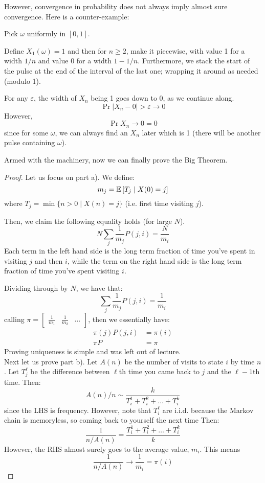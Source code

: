 However, convergence in probability does not always imply almost sure convergence. Here is a counter-example:

\begin{example} 
    Pick $\omega$ uniformly in $[0, 1]$.

    Define $X_1(\omega) = 1$ and then for $n \geq 2$, make it piecewise, with value 1 for a width $1/n$ and value
    0 for a width $1 - 1/n$. Furthermore, we stack the start of the pulse at the end of the interval of the last one; wrapping it around as
    needed (modulo 1).

    For any $\varepsilon$, the width of $X_n$ being 1 goes down to 0, as we continue along.
    \[ \Pr{|X_n - 0| > \varepsilon} \to 0 \]
    However,
    \[\Pr{X_n \to 0} = 0\]
    since for some $\omega$, we can always find an $X_n$ later which is 1 (there will be another pulse containing $\omega$).
\end{example}

Armed with the machinery, now we can finally prove the Big Theorem.

\begin{proof}
    Let us focus on part a).
    We define:
    \[ m_j = \mathbb{E}\left[ T_j \mid X(0) = j \right] \]
    where $T_j = \min\{n > 0 \mid X(n) = j\}$ (i.e. first time visiting $j$).

    Then, we claim the following equality holds (for large $N$).
    \[ N \sum_j \frac{1}{m_j} P(j, i) = \frac{N}{m_i} \]
    Each term in the left hand side is the long term fraction of time you've spent in visiting $j$ and then $i$,
    while the term on the right hand side is the long term fraction of time you've spent visiting $i$.

    Dividing through by $N$, we have that:
    \[ \sum_j \frac{1}{m_j} P(j, i) = \frac{1}{m_i} \]
    calling $\pi = \begin{bmatrix}
        \frac{1}{m_1} & \frac{1}{m_2} & \dots
    \end{bmatrix}$, then we essentially have:
    \begin{align*}
        \pi(j) P(j, i) &= \pi(i) \\
        \pi P &= \pi
    \end{align*}
    Proving uniqueness is simple and was left out of lecture.
\\

    Next let us prove part b).
    Let $A(n)$ be the number of visits to state $i$ by time $n$.
    Let $T_j^{\ell}$ be the difference between $\ell$th time you came back to $j$ and the $\ell -1$th time. Then:
    \[ A(n)/n \sim \frac{k}{T_i^1 + T_i^2 + \dots + T_i^k} \]
    since the LHS is frequency.
    However, note that $T_i^{\ell}$ are i.i.d. because the Markov chain is memoryless, so coming back to yourself the next time
    Then:
    \[ \frac{1}{n/A(n)} = \frac{T_i^1 + T_i^2 + \dots + T_i^k}{k} \]
    However, the RHS almost surely goes to the average value, $m_i$. This means
    \[ \frac{1}{n/A(n)} \to \frac{1}{m_i} = \pi(i) \]
\end{proof}


